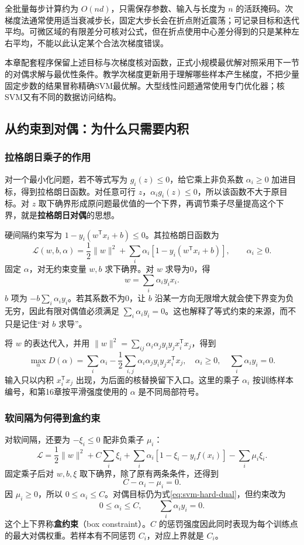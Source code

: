 \documentclass[UTF8,fontset=none,zihao=-4,a4paper]{ctexart}
\newcommand{\term}[1]{\textbf{#1}}
\numberwithin{equation}{section}
\numberwithin{figure}{section}
\begin{document}
全批量每步计算约为 $O(nd)$，只需保存参数、输入与长度为 $n$ 的活跃掩码。次梯度法通常使用适当衰减步长，固定大步长会在折点附近震荡；可记录目标和迭代平均。可微区域的有限差分可核对公式，但在折点使用中心差分得到的只是某种左右平均，不能以此认定某个合法次梯度错误。

本章配套程序保留上述目标与次梯度核对函数，正式小规模最优解对照采用下一节的对偶求解与最优性条件。教学次梯度更新用于理解哪些样本产生梯度，不把少量固定步数的结果冒称精确SVM最优解。大型线性问题通常使用专门优化器；核SVM又有不同的数据访问结构。

\subsection{从约束到对偶：为什么只需要内积}
\subsubsection{拉格朗日乘子的作用}
对一个最小化问题，若不等式写为 $g_i(z)\le0$，给它乘上非负系数 $\alpha_i\ge0$ 加进目标，得到拉格朗日函数。对任意可行 $z$，$\alpha_i g_i(z)\le0$，所以该函数不大于原目标。对 $z$ 取下确界形成原问题最优值的一个下界，再调节乘子尽量提高这个下界，就是\term{拉格朗日对偶}的思想。

硬间隔约束写为 $1-y_i(w^{\mathsf T}x_i+b)\le0$。其拉格朗日函数为
\[
 \mathcal L(w,b,\alpha)=\frac12\|w\|^2
   +\sum_i\alpha_i[1-y_i(w^{\mathsf T}x_i+b)],\qquad\alpha_i\ge0.
\]
固定 $\alpha$，对无约束变量 $w,b$ 求下确界。对 $w$ 求导为0，得
\[
 w=\sum_i\alpha_i y_i x_i.
\]
$b$ 项为 $-b\sum_i\alpha_i y_i$。若其系数不为0，让 $b$ 沿某一方向无限增大就会使下界变为负无穷，因此有限对偶值必须满足 $\sum_i\alpha_i y_i=0$。这也解释了等式约束的来源，而不只是记住“对 $b$ 求导”。

将 $w$ 的表达代入，并用
$\|w\|^2=\sum_{ij}\alpha_i\alpha_j y_iy_jx_i^{\mathsf T}x_j$，得到
\begin{equation}\label{eq:svm-hard-dual}
 \max_\alpha D(\alpha)=\sum_i\alpha_i
 -\frac12\sum_{i,j}\alpha_i\alpha_jy_iy_jx_i^{\mathsf T}x_j,
 \quad\alpha_i\ge0,\quad\sum_i\alpha_i y_i=0.
\end{equation}
输入只以内积 $x_i^{\mathsf T}x_j$ 出现，为后面的核替换留下入口。这里的乘子 $\alpha_i$ 按训练样本编号，和第16章按平滑强度使用的 $\alpha$ 是不同局部符号。

\subsubsection{软间隔为何得到盒约束}
对软间隔，还要为 $-\xi_i\le0$ 配非负乘子 $\mu_i$：
\[
 \mathcal L=\frac12\|w\|^2+C\sum_i\xi_i
 +\sum_i\alpha_i[1-\xi_i-y_if(x_i)]-\sum_i\mu_i\xi_i.
\]
固定乘子后对 $w,b,\xi$ 取下确界，除了原有两条条件，还得到
\[
 C-\alpha_i-\mu_i=0.
\]
因 $\mu_i\ge0$，所以 $0\le\alpha_i\le C$。对偶目标仍为式\eqref{eq:svm-hard-dual}，但约束改为
\begin{equation}\label{eq:svm-soft-dual}
 0\le\alpha_i\le C,\qquad\sum_i\alpha_i y_i=0.
\end{equation}
这个上下界称\term{盒约束}（box constraint）。$C$ 的惩罚强度因此同时表现为每个训练点的最大对偶权重。若样本有不同惩罚 $C_i$，对应上界就是 $C_i$。
\end{document}
